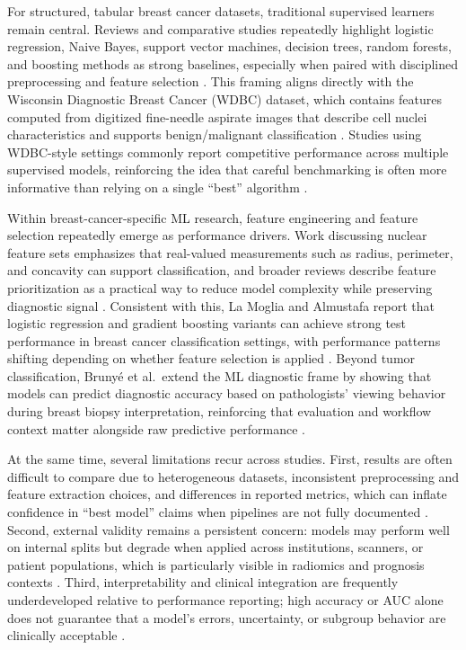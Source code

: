 \documentclass[conference]{IEEEtran}
\begin{document}
For structured, tabular breast cancer datasets, traditional supervised learners remain central. Reviews and comparative studies repeatedly highlight logistic regression, Naive Bayes, support vector machines, decision trees, random forests, and boosting methods as strong baselines, especially when paired with disciplined preprocessing and feature selection \cite{b7,b10,b9}. This framing aligns directly with the Wisconsin Diagnostic Breast Cancer (WDBC) dataset, which contains features computed from digitized fine-needle aspirate images that describe cell nuclei characteristics and supports benign/malignant classification \cite{b12}. Studies using WDBC-style settings commonly report competitive performance across multiple supervised models, reinforcing the idea that careful benchmarking is often more informative than relying on a single ``best'' algorithm \cite{b11,b18}.

Within breast-cancer-specific ML research, feature engineering and feature selection repeatedly emerge as performance drivers. Work discussing nuclear feature sets emphasizes that real-valued measurements such as radius, perimeter, and concavity can support classification, and broader reviews describe feature prioritization as a practical way to reduce model complexity while preserving diagnostic signal \cite{b17,b9}. Consistent with this, La Moglia and Almustafa report that logistic regression and gradient boosting variants can achieve strong test performance in breast cancer classification settings, with performance patterns shifting depending on whether feature selection is applied \cite{b13}. Beyond tumor classification, Bruny\'e et al.\ extend the ML diagnostic frame by showing that models can predict diagnostic accuracy based on pathologists' viewing behavior during breast biopsy interpretation, reinforcing that evaluation and workflow context matter alongside raw predictive performance \cite{b19}.

At the same time, several limitations recur across studies. First, results are often difficult to compare due to heterogeneous datasets, inconsistent preprocessing and feature extraction choices, and differences in reported metrics, which can inflate confidence in ``best model'' claims when pipelines are not fully documented \cite{b10,b8}. Second, external validity remains a persistent concern: models may perform well on internal splits but degrade when applied across institutions, scanners, or patient populations, which is particularly visible in radiomics and prognosis contexts \cite{b14,b15,b16}. Third, interpretability and clinical integration are frequently underdeveloped relative to performance reporting; high accuracy or AUC alone does not guarantee that a model's errors, uncertainty, or subgroup behavior are clinically acceptable \cite{b7,b8}.
\end{document}
